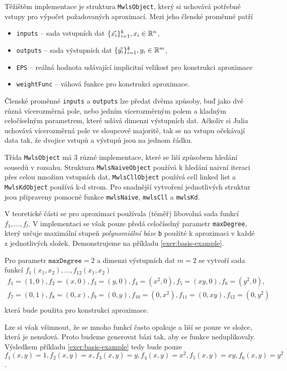 Těžištěm implementace je struktura \texttt{MwlsObject}, který si uchovává potřebné vstupy pro výpočet požadovaných aproximací. Mezi jeho členské proměnné patří
\begin{itemize}
  \item \texttt{inputs} -- sada vstupních dat $\{\vec{x_i}\}_{i=1}^k, x_i \in \mathbb{R}^n$,
  \item \texttt{outputs} -- sada výstupních dat $\{\vec{y_i}\}_{i=1}^k, y_i \in \mathbb{R}^m$,
  \item \texttt{EPS} -- reálná hodnota udávající implicitní velikost  pro konstrukci aproximace
  \item \texttt{weightFunc} -- váhová funkce pro konstrukci aproximace.
\end{itemize}
Členské proměnné \texttt{inputs} a \texttt{outputs} lze předat dvěma způsoby, buď jako dvě různá vícerozměrná pole, nebo jedním vícerozměrným polem a kladným celočíselným parametrem, které udává dimenzi výstupních dat. Ačkoliv si Julia uchovává vícerozměrná pole ve sloupcové majoritě, tak se na vstupu očekávají data tak, že dvojice vstupů a výstupů jsou na jednom řádku.

Třída \texttt{MwlsObject} má 3 různé implementace, které se liší způsobem hledání sousedů v rozsahu. Struktura \texttt{MwlsNaiveObject} používá k hledání naivní iteraci přes celou množinu vstupních dat, \texttt{MwlsCllObject} používá cell linked list a \texttt{MwlsKdObject} používá k-d strom. Pro snadnější vytvoření jednotlivých struktur jsou připraveny pomocné funkce \texttt{mwlsNaive}, \texttt{mwlsCll} a \texttt{mwlsKd}.

V teoretické části se pro aproximaci používala (téměř) libovolná sada funkcí $f_1, \ldots, f_l$. V implementaci se však pouze předá celočíselný parametr \texttt{maxDegree}, který určuje maximální stupeň \textit{polynomiální báze} \texttt{b} použité k aproximaci v každé z jednotlivých složek. Demonstrujeme na příkladu \ref{exer:basis-example}.
\begin{priklad}
  \label{exer:basis-example}
  Pro parametr $\texttt{maxDegree} = 2$ a dimenzi výstupních dat $m = 2$ se vytvoří sada funkcí $f_1(x_1, x_2), \ldots, f_{12}(x_1, x_2)$
  \begin{multline}
    f_1 = (1, 0), f_2 = (x, 0), f_3 = (y, 0), f_4 = (x^2, 0), f_5 = (xy, 0), f_6 = (y^2, 0),\\
    f_7 = (0, 1), f_8 = (0, x), f_9 = (0, y), f_{10} = (0, x^2), f_{11} = (0, xy), f_{12} = (0, y^2)\\
  \end{multline}
  která bude použita pro konstrukci aproximace.
\end{priklad}
Lze si však všimnout, že se mnoho funkcí často opakuje a liší se pouze ve složce, která je nenulová. Proto budeme generovat bázi tak, aby se funkce neduplikovaly. Výsledkem příkladu \ref{exer:basis-example} tedy bude pouze $f_1(x, y) = 1, f_2(x, y) = x, f_3(x,y) = y, f_4(x,y)=x^2,f_5(x, y)=xy,f_6(x, y)=y^2$.

